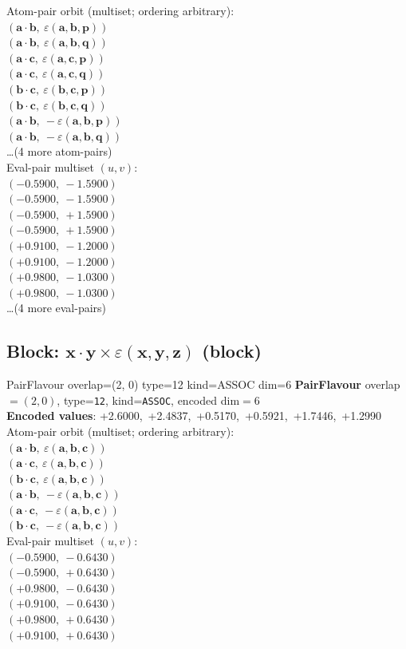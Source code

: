 \documentclass[a4paper,11pt]{article}
\newcommand{\pdcegfomjfhook}[2]{\mathbf{#1} \cdot \mathbf{#2}}
\newcommand{\kblbmcpggoncpf}[3]{\varepsilon(\mathbf{#1},\mathbf{#2},\mathbf{#3})}
\begin{document}
\quad Atom-pair orbit (multiset; ordering arbitrary):\\
$(\pdcegfomjfhook{a}{b},\ \kblbmcpggoncpf{a}{b}{p})$\\
$(\pdcegfomjfhook{a}{b},\ \kblbmcpggoncpf{a}{b}{q})$\\
$(\pdcegfomjfhook{a}{c},\ \kblbmcpggoncpf{a}{c}{p})$\\
$(\pdcegfomjfhook{a}{c},\ \kblbmcpggoncpf{a}{c}{q})$\\
$(\pdcegfomjfhook{b}{c},\ \kblbmcpggoncpf{b}{c}{p})$\\
$(\pdcegfomjfhook{b}{c},\ \kblbmcpggoncpf{b}{c}{q})$\\
$(\pdcegfomjfhook{a}{b},\ -\kblbmcpggoncpf{a}{b}{p})$\\
$(\pdcegfomjfhook{a}{b},\ -\kblbmcpggoncpf{a}{b}{q})$\\
\quad \ldots (4 more atom-pairs)\\
\quad Eval-pair multiset $(u, v)$:\\
$(-0.5900,\ -1.5900)$\\
$(-0.5900,\ -1.5900)$\\
$(-0.5900,\ +1.5900)$\\
$(-0.5900,\ +1.5900)$\\
$(+0.9100,\ -1.2000)$\\
$(+0.9100,\ -1.2000)$\\
$(+0.9800,\ -1.0300)$\\
$(+0.9800,\ -1.0300)$\\
\quad \ldots (4 more eval-pairs)\\

\subsection{Block: $\pdcegfomjfhook{x}{y} \times \kblbmcpggoncpf{x}{y}{z}$  (block)}
    PairFlavour  overlap=(2, 0)  type=12  kind=ASSOC  dim=6
\textbf{PairFlavour} overlap$=(2, 0)$, type=\texttt{12}, kind=\texttt{ASSOC}, encoded dim$=6$\\
\textbf{      Encoded values}: +2.6000,\ +2.4837,\ +0.5170,\ +0.5921,\ +1.7446,\ +1.2990\\
\quad Atom-pair orbit (multiset; ordering arbitrary):\\
$(\pdcegfomjfhook{a}{b},\ \kblbmcpggoncpf{a}{b}{c})$\\
$(\pdcegfomjfhook{a}{c},\ \kblbmcpggoncpf{a}{b}{c})$\\
$(\pdcegfomjfhook{b}{c},\ \kblbmcpggoncpf{a}{b}{c})$\\
$(\pdcegfomjfhook{a}{b},\ -\kblbmcpggoncpf{a}{b}{c})$\\
$(\pdcegfomjfhook{a}{c},\ -\kblbmcpggoncpf{a}{b}{c})$\\
$(\pdcegfomjfhook{b}{c},\ -\kblbmcpggoncpf{a}{b}{c})$\\
\quad Eval-pair multiset $(u, v)$:\\
$(-0.5900,\ -0.6430)$\\
$(-0.5900,\ +0.6430)$\\
$(+0.9800,\ -0.6430)$\\
$(+0.9100,\ -0.6430)$\\
$(+0.9800,\ +0.6430)$\\
$(+0.9100,\ +0.6430)$\\
\end{document}
